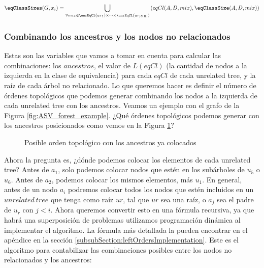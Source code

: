 
\begin{align}\label{formula:equiv_classes_sizes}
    \eqClassSizes(G, x_i) = 
    \bigcup_{\forall mix \in \unrEqCl(ur_1) \times \dots \times \unrEqCl(ur_{|UR|})} \left( eqCl(A,D, mix) , \eqClassSize(A,D,mix) \right) 
\end{align}


\subsubsection{Combinando los ancestros y los nodos no relacionados}

Estas son las variables que vamos a tomar en cuenta para calcular las combinaciones: los $ancestros$, el valor de $L(eqCl)$ (la cantidad de nodos a la izquierda en la clase de equivalencia) para cada $eqCl$ de cada unrelated tree, y la raíz de cada árbol no relacionado. Lo que queremos hacer es definir el número de órdenes topológicos que podemos generar combinando los nodos a la izquierda de cada unrelated tree con los ancestros. Veamos un ejemplo con el grafo de la Figura \ref{fig:ASV_forest_example}. ¿Qué órdenes topológicos podemos generar con los ancestros posicionados como vemos en la Figura \ref{fig:order_of_ancestors}?

\begin{figure}[ht]
    \centering
    \caption{Posible orden topológico con los ancestros ya colocados}
    \label{fig:order_of_ancestors}
\end{figure}

Ahora la pregunta es, ¿dónde podemos colocar los elementos de cada unrelated tree? Antes de $a_1$, solo podemos colocar nodos que estén en los subárboles de $u_5$ o $u_6$. Antes de $a_2$, podemos colocar los mismos elementos, más $u_1$. En general, antes de un nodo $a_i$ podremos colocar todos los nodos que estén incluidos en un $unrelated \ tree$ que tenga como raíz $ur$, tal que $ur$ sea una raíz, o $a_j$ sea el padre de $u_r$ con $j<i$. Ahora queremos convertir esto en una fórmula recursiva, ya que habrá una superposición de problemas utilizamos programación dinámica al implementar el algoritmo. La fórmula más detallada la pueden encontrar en el apéndice en la sección \ref{subsubSection:leftOrdersImplementation}. Este es el algoritmo para contabilizar las combinaciones posibles entre los nodos no relacionados y los ancestros:\\


